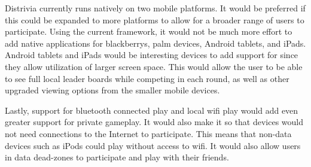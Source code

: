 \documentclass{dependencies/acm_proc_article-sp}
\begin{document}
Distrivia currently runs natively on two mobile platforms.
It would be preferred if this could be expanded to more platforms to allow for a broader range of users to participate.
Using the current framework, it would not be much more effort to add native applications for blackberrys, palm devices, Android tablets, and iPads.
Android tablets and iPads would be interesting devices to add support for since they allow utilization of larger screen space.
This would allow the user to be able to see full local leader boards while competing in each round, as well as other upgraded viewing options from the smaller mobile devices.

Lastly, support for bluetooth connected play and local wifi play would add even greater support for private gameplay. 
It would also make it so that devices would not need connections to the Internet to participate.
This means that non-data devices such as iPods could play without access to wifi.
It would also allow users in data dead-zones to participate and play with their friends.

\newpage
%

%
%
\balancecolumns
\end{document}
